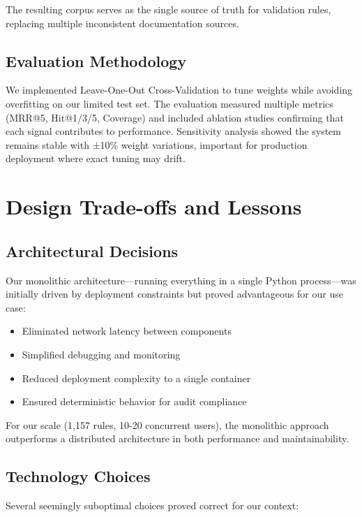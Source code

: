 The resulting corpus serves as the single source of truth for validation rules, replacing multiple inconsistent documentation sources.

\subsection{Evaluation Methodology}

We implemented Leave-One-Out Cross-Validation to tune weights while avoiding overfitting on our limited test set. The evaluation measured multiple metrics (MRR@5, Hit@1/3/5, Coverage) and included ablation studies confirming that each signal contributes to performance. Sensitivity analysis showed the system remains stable with ±10\% weight variations, important for production deployment where exact tuning may drift.

\section{Design Trade-offs and Lessons}

\subsection{Architectural Decisions}

Our monolithic architecture—running everything in a single Python process—was initially driven by deployment constraints but proved advantageous for our use case:

\begin{itemize}[leftmargin=*,itemsep=2pt,topsep=2pt]
  \item Eliminated network latency between components
  \item Simplified debugging and monitoring
  \item Reduced deployment complexity to a single container
  \item Ensured deterministic behavior for audit compliance
\end{itemize}

For our scale (1,157 rules, 10-20 concurrent users), the monolithic approach outperforms a distributed architecture in both performance and maintainability.

\subsection{Technology Choices}

Several seemingly suboptimal choices proved correct for our context:

